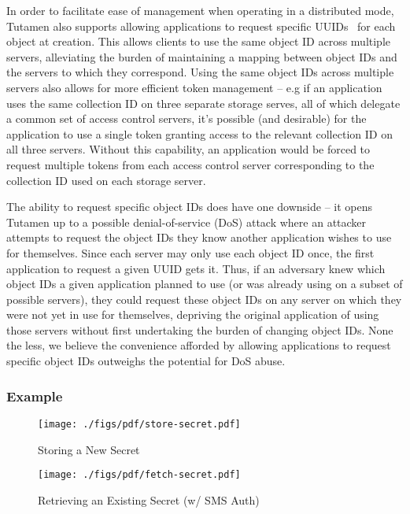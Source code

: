 In order to facilitate ease of management when operating in a
distributed mode, Tutamen also supports allowing applications to
request specific UUIDs~\cite{leach2005} for each object at creation.
This allows clients to use the same object ID across multiple servers,
alleviating the burden of maintaining a mapping between object IDs and
the servers to which they correspond. Using the same object IDs across
multiple servers also allows for more efficient token management --
e.g if an application uses the same collection ID on three separate
storage serves, all of which delegate a common set of access control
servers, it's possible (and desirable) for the application to use a
single token granting access to the relevant collection ID on all
three servers. Without this capability, an application would be forced
to request multiple tokens from each access control server
corresponding to the collection ID used on each storage server.

The ability to request specific object IDs does have one downside --
it opens Tutamen up to a possible denial-of-service (DoS) attack where
an attacker attempts to request the object IDs they know another
application wishes to use for themselves. Since each server may only
use each object ID once, the first application to request a given UUID
gets it. Thus, if an adversary knew which object IDs a given
application planned to use (or was already using on a subset of
possible servers), they could request these object IDs on any server
on which they were not yet in use for themselves, depriving the
original application of using those servers without first undertaking
the burden of changing object IDs. None the less, we believe the
convenience afforded by allowing applications to request specific
object IDs outweighs the potential for DoS abuse.

\subsubsection{Example}

\begin{figure}[th]
  \centering
  \texttt{[image: ./figs/pdf/store-secret.pdf]}
  \caption{Storing a New Secret}
  \label{fig:tutamen:storesecret}
\end{figure}

\begin{figure}[th]
  \centering
  \texttt{[image: ./figs/pdf/fetch-secret.pdf]}
  \caption{Retrieving an Existing Secret (w/ SMS Auth)}
  \label{fig:tutamen:fetchsecret}
\end{figure}

